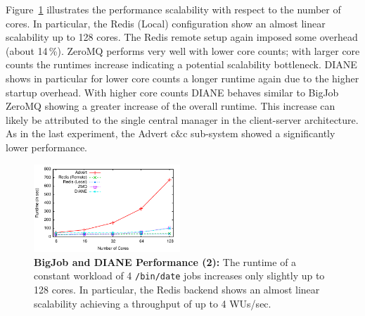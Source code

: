 \documentclass[conference,final]{IEEEtran}
\begin{document}
Figure~\ref{fig:perf_bigjob-varying-cores} illustrates the performance
scalability with respect to the number of cores. In particular, the Redis
(Local) configuration show an almost linear scalability up to 128 cores. The
Redis remote setup again imposed some overhead (about 14\,\%). ZeroMQ performs
very well with lower core counts; with larger core counts the runtimes increase
indicating a potential scalability bottleneck. DIANE shows in particular for
lower core counts a longer runtime again due to the higher startup overhead.
With higher core counts DIANE behaves similar to BigJob ZeroMQ showing a greater
increase of the overall runtime. This increase can likely be attributed to
the single central manager in the client-server architecture. As in the last
experiment, the Advert c\&c sub-system showed a significantly lower performance.

\begin{figure}[htbp] \centering
\includegraphics[width=0.49\textwidth]{perf/bigjob-varying-cores-alamo.pdf}
\caption{\textbf{BigJob and DIANE Performance (2):}  The
runtime of a constant workload of 4 \texttt{/bin/date} jobs 
increases only slightly up to 128 cores. In particular, the Redis backend shows
an almost linear scalability achieving a throughput of up to 4 WUs/sec. }
\label{fig:perf_bigjob-varying-cores} \end{figure}
\end{document}
